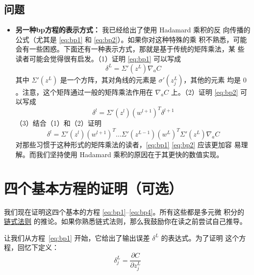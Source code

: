 \subsection*{问题}

\begin{itemize}
\item \textbf{另一种\gls*{bp}方程的表示方式：} 我已经给出了使用 Hadamard 乘积的反
  向传播的公式（尤其是 \eqref{eq:bp1} 和 \eqref{eq:bp2}）。如果你对这种特殊的乘
  积不熟悉，可能会有一些困惑。下面还有一种表示方式，那就是基于传统的矩阵乘法，某
  些读者可能会觉得很有启发。（1）证明 \eqref{eq:bp1} 可以写成
  \begin{equation}
    \delta^L = \Sigma'(z^L) \nabla_a C
    \label{eq:33}\tag{33}
  \end{equation}
  其中 $\Sigma'(z^L)$ 是一个方阵，其对角线的元素是 $\sigma'(z_j^L)$，其他的元素
  均是 $0$。注意，这个矩阵通过一般的矩阵乘法作用在 $\nabla_a C$ 上。（2）证明
  \eqref{eq:bp2} 可以写成
  \begin{equation}
    \delta^l = \Sigma'(z^l) (w^{l+1})^T \delta^{l+1}
    \label{eq:34}\tag{34}
  \end{equation}
  （3）结合（1）和（2）证明
  \begin{equation}
    \delta^l = \Sigma'(z^l) (w^{l+1})^T \ldots \Sigma'(z^{L-1}) (w^L)^T
    \Sigma'(z^L) \nabla_a C
    \label{eq:35}\tag{35}
  \end{equation}
  对那些习惯于这种形式的矩阵乘法的读者，\eqref{eq:bp1} \eqref{eq:bp2} 应该更加容
  易理解。而我们坚持使用 Hadamard 乘积的原因在于其更快的数值实现。
\end{itemize}

\section{四个基本方程的证明（可选）}
\label{sec:proof_of_the_four_fundamental_equations}

我们现在证明这四个基本的方程 \eqref{eq:bp1}--\eqref{eq:bp4}。所有这些都是多元微
积分的\href{https://en.wikipedia.org/wiki/Chain_rule}{链式法则}%
的推论。如果你熟悉链式法则，那么我鼓励你在读之前尝试自己推导。

让我们从方程~\eqref{eq:bp1} 开始，它给出了输出误差 $\delta^L$ 的表达式。为了证明
这个方程，回忆下定义：
\begin{equation}
  \delta^L_j = \frac{\partial C}{\partial z^L_j}
\label{eq:36}\tag{36}
\end{equation}

